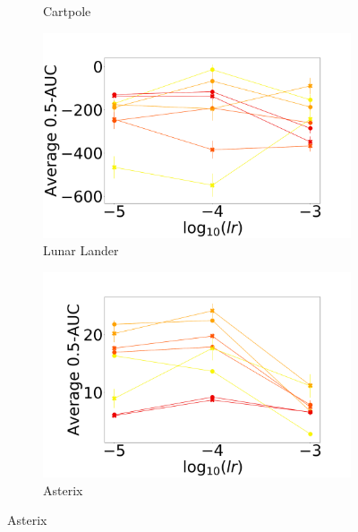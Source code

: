 \documentclass{article}
\begin{document}
\begin{figure}[!ht]
\begin{subfigure}[b]{0.25\linewidth}
    \caption{Cartpole
    }\label{fig:cartpole}
  \end{subfigure}%
  \begin{subfigure}[b]{0.25\linewidth}
    \centering
    \includegraphics[width=\columnwidth]{figs/deep/discrete/sensitivity/UNLABELED_kl_auc-0.5_LunarLander_lr_sensitivity.png} 
    \caption{Lunar Lander}
    \label{fig:lunar-lander}
  \end{subfigure}%
  \begin{subfigure}[b]{0.25\linewidth}
    \centering
    \includegraphics[width=\columnwidth]{figs/deep/discrete/sensitivity/UNLABELED_kl_auc-0.5_asterix_lr_sensitivity.png} 
    \caption{Asterix
    }\label{fig:asterix}
  \end{subfigure}%
  

\end{figure}
\end{document}
